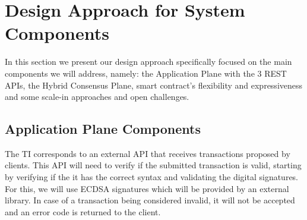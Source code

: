 



\section{Design Approach for System Components}
\label{sec:approach:design}

In this section we present our design approach specifically focused on the main components we will address, namely: the Application Plane with the $3$ REST APIs, the Hybrid Consensus Plane, smart contract's flexibility and expressiveness and some scale-in approaches and open challenges.

\subsection{Application Plane Components}


The \gls{TI} corresponds to an external API that receives transactions proposed by clients. This API will need to verify if the submitted transaction is valid, starting by verifying if the it has the correct syntax and validating the digital signatures. For this, we will use ECDSA signatures which will be provided by an external library. In case of a transaction being considered invalid, it will not be accepted and an error code is returned to the client. 



